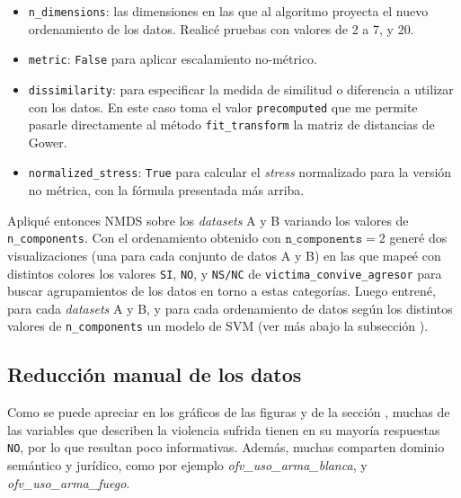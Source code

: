 \documentclass[10 pt]{article}
\begin{document}
\begin{itemize}
   \item \texttt{n\_dimensions}: las dimensiones en las que al algoritmo proyecta el nuevo ordenamiento de los datos. Realicé pruebas con valores de 2 a 7, y 20. 
   \item \texttt{metric}: \texttt{False} para aplicar escalamiento no-métrico. 
   \item \texttt{dissimilarity}: para especificar la medida de similitud o diferencia a utilizar con los datos. En este caso toma el valor \texttt{precomputed} que me permite pasarle directamente al método \texttt{fit\_transform} la matriz de distancias de Gower.
   \item \texttt{normalized\_stress}: \texttt{True} para calcular el \textit{stress} normalizado para la versión no métrica, con la fórmula presentada más arriba.
\end{itemize}

Apliqué entonces NMDS sobre los \textit{datasets} A y B variando los valores de \texttt{n\_components}. Con el ordenamiento obtenido con \(\texttt{n\_components} = 2\) generé dos visualizaciones (una para cada conjunto de datos A y B) en las que mapeé con distintos colores los valores \texttt{SI}, \texttt{NO}, y \texttt{NS/NC} de \texttt{victima\_convive\_agresor} para buscar agrupamientos de los datos en torno a estas categorías. Luego entrené, para cada \textit{datasets} A y B, y para cada ordenamiento de datos según los distintos valores de \texttt{n\_components} un modelo de SVM (ver más abajo la subsección ).



\subsection{Reducción manual de los datos}\label{reduccionmanual}

Como se puede apreciar en los gráficos de las figuras  y  de la sección , muchas de las variables que describen la violencia sufrida tienen en su mayoría respuestas \texttt{NO}, por lo que resultan poco informativas. Además, muchas comparten dominio semántico y jurídico, como por ejemplo \textit{ofv\_uso\_arma\_blanca}, y \textit{ofv\_uso\_arma\_fuego}.
\end{document}
